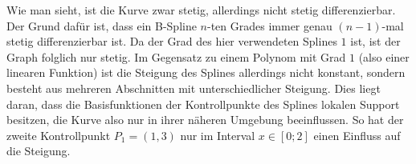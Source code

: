Wie man sieht, ist die Kurve zwar stetig, allerdings nicht stetig differenzierbar. Der Grund dafür ist, dass ein B-Spline $n$-ten Grades immer genau $(n-1)$-mal stetig differenzierbar ist. Da der Grad des hier verwendeten Splines $1$ ist, ist der Graph folglich nur stetig. Im Gegensatz zu einem Polynom mit Grad $1$ (also einer linearen Funktion) ist die Steigung des Splines allerdings nicht konstant, sondern besteht aus mehreren Abschnitten mit unterschiedlicher Steigung. Dies liegt daran, dass die Basisfunktionen der Kontrollpunkte des Splines lokalen Support besitzen, die Kurve also nur in ihrer näheren Umgebung beeinflussen. So hat der zweite Kontrollpunkt $P_1 = (1, 3)$ nur im Interval $x\in [0;2]$ einen Einfluss auf die Steigung.